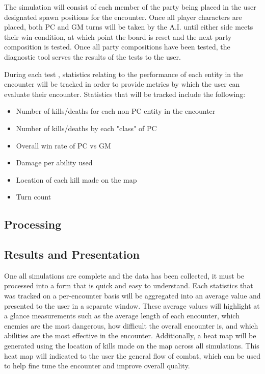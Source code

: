 \documentclass[12pt,a4paper]{report}
\begin{document}
		The simulation will consist of each member of the party being placed in the user designated spawn positions for the encounter. Once all player characters are placed, both PC and GM turns will be taken by the A.I. until either side meets their win condition, at which point the board is reset and the next party composition is tested. Once all party compositions have been tested, the diagnostic tool serves the results of the tests to the user.
		
		 During each test , statistics relating to the performance of each entity in the encounter will be tracked in order to provide metrics by which the user can evaluate their encounter. Statistics that will be tracked include the following:
		 
		\begin{itemize}
			\item Number of kills/deaths for each non-PC entity in the encounter
			\item Number of kills/deaths by each "class" of PC
			\item Overall win rate of PC vs GM
			\item Damage per ability used
			\item Location of each kill made on the map
			\item Turn count
		\end{itemize}
	
		\subsection{Processing}
		
		
		\subsection{Results and Presentation}
		One all simulations are complete and the data has been collected, it must be processed into a form that is quick and easy to understand. Each statistics that was tracked on a per-encounter basis will be aggregated into an average value and presented to the user in a separate window. These average values will highlight at a glance measurements such as the average length of each encounter, which enemies are the most dangerous, how difficult the overall encounter is, and which abilities are the most effective in the encounter. Additionally, a heat map will be generated using the location of kills made on the map across all simulations. This heat map will indicated to the user the general flow of combat, which can be used to help fine tune the encounter and improve overall quality. 
		
\end{document}
